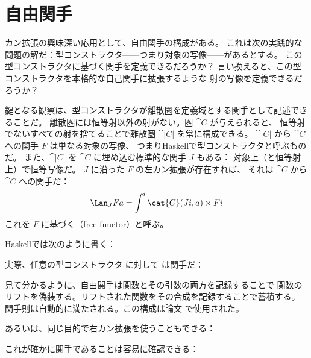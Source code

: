 \section{自由関手}

カン拡張の興味深い応用として、自由関手の構成がある。
これは次の実践的な問題の解だ：型コンストラクタ——つまり対象の写像——があるとする。
この型コンストラクタに基づく関手を定義できるだろうか？
言い換えると、この型コンストラクタを本格的な自己関手に拡張するような
射の写像を定義できるだろうか？

鍵となる観察は、型コンストラクタが離散圏を定義域とする関手として記述できることだ。
離散圏には恒等射以外の射がない。圏 $\cat{C}$ が与えられると、
恒等射でないすべての射を捨てることで離散圏 $\cat{|C|}$ を常に構成できる。
$\cat{|C|}$ から $\cat{C}$ への関手 $F$ は単なる対象の写像、
つまりHaskellで型コンストラクタと呼ぶものだ。
また、$\cat{|C|}$ を $\cat{C}$ に埋め込む標準的な関手 $J$ もある：
対象上（と恒等射上）で恒等写像だ。
$J$ に沿った $F$ の左カン拡張が存在すれば、
それは $\cat{C}$ から $\cat{C}$ への関手だ：
\[\Lan_{J}F a = \int^i \cat{C}(J i, a)\times{}F i\]
これを $F$ に基づく（free functor）と呼ぶ。

Haskellでは次のように書く：

実際、任意の型コンストラクタ  に対して  は関手だ：

見て分かるように、自由関手は関数とその引数の両方を記録することで
関数のリフトを偽装する。リフトされた関数をその合成を記録することで蓄積する。
関手則は自動的に満たされる。この構成は論文
で使用された。

あるいは、同じ目的で右カン拡張を使うこともできる：

これが確かに関手であることは容易に確認できる：

